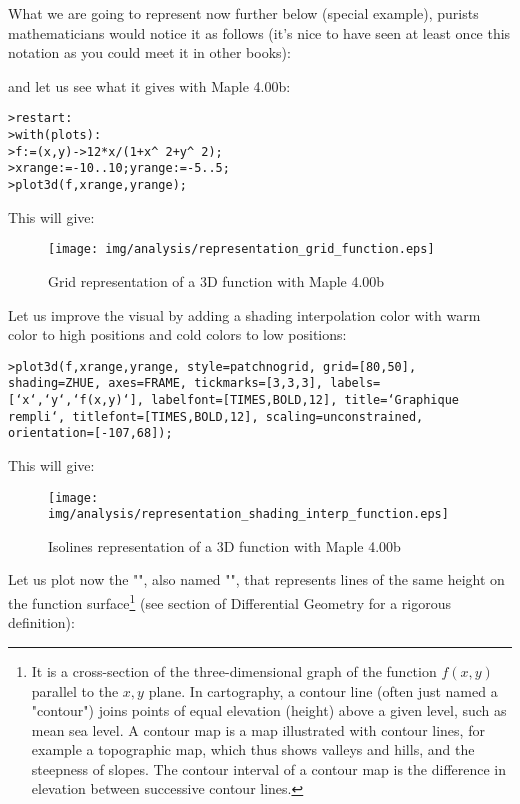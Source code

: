 What we are going to represent now further below (special example), purists mathematicians would notice it as follows (it's nice to have seen at least once this notation as you could meet it in other books):
	
and let us see what it gives with  Maple 4.00b:

\texttt{>restart:}\\
\texttt{>with(plots):}\\
\texttt{>f:=(x,y)->12*x/(1+x\string^ 2+y\string^ 2);}\\
\texttt{>xrange:=-10..10;yrange:=-5..5;}\\
\texttt{>plot3d(f,xrange,yrange);}

This will give:

\begin{figure}[H]
\centering
\texttt{[image: img/analysis/representation\_grid\_function.eps]}
\caption{Grid representation of a 3D function with Maple 4.00b}
\end{figure}

Let us improve the visual by adding a shading interpolation color with warm color to high positions and cold colors to low positions:

\texttt{>plot3d(f,xrange,yrange, style=patchnogrid, grid=[80,50], shading=ZHUE, axes=FRAME, tickmarks=[3,3,3], labels=[`x`,`y`,`f(x,y)`], labelfont=[TIMES,BOLD,12], title=`Graphique rempli`, titlefont=[TIMES,BOLD,12], scaling=unconstrained, orientation=[-107,68]);}

This will give:

\begin{figure}[H]
\centering
\texttt{[image: img/analysis/representation\_shading\_interp\_function.eps]}
\caption{Isolines representation of a 3D function with Maple 4.00b}
\end{figure}

Let us plot now the "", also named "", that represents lines of the same height on the function surface\footnote{It is a cross-section of the three-dimensional graph of the function $f(x, y)$ parallel to the $x, y$ plane. In cartography, a contour line (often just named a "contour") joins points of equal elevation (height) above a given level, such as mean sea level. A contour map is a map illustrated with contour lines, for example a topographic map, which thus shows valleys and hills, and the steepness of slopes. The contour interval of a contour map is the difference in elevation between successive contour lines.} (see section of Differential Geometry for a rigorous definition):

